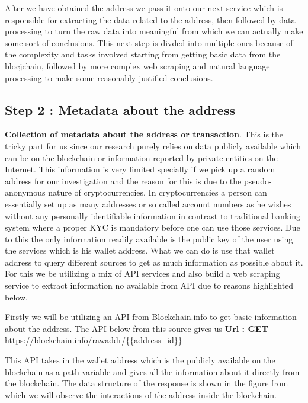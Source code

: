 \documentclass{article}
\begin{document}
        After we have obtained the address we pass it onto our next service which is responsible for extracting the data related to the address, then followed by data processing to turn the raw data into meaningful from which we can actually make some sort of conclusions. This next step is divded into multiple ones because of the complexity and tasks involved starting from getting basic data from the blocjchain, followed by more complex web scraping and natural language processing to make some reasonably justified conclusions.
        
        
    \subsection{Step 2 : Metadata about the address}
    
        \textbf{Collection of metadata about the address or transaction}. 
        This is the tricky part for us since our research purely relies on data publicly available which can be on the blockchain or information reported by private entities on the Internet. This information is very limited specially if we pick up a random address for our investigation and the reason for this is due to the pseudo-anonymous nature of cryptocurrencies. In cryptocurrencies a person can essentially set up as many addresses or so called account numbers as he wishes without any personally identifiable information in contrast to traditional banking system where a proper KYC is mandatory before one can use those services. Due to this the only information readily available is the public key of the user using the services which is his wallet address. What we can do is use that wallet address to query different sources to get as much information as possible about it. For this we be utilizing a mix of API services and also build a web scraping service to extract information no available from API due to reasons highlighted below.
        
        
        
        Firstly we will be utilizing an API from Blockchain.info\cite{blockchain.com} to get basic information about the address. The API below from this source gives us
        \textbf{Url : GET} \url{https://blockchain.info/rawaddr/{{address_id}}}
        
        This API takes in the wallet address which is the publicly available on the blockchain as a path variable and gives all the information about it directly from the blockchain. The data structure of the response is shown in the figure\cite{} from which we will observe the interactions of the address inside the blockchain.
        
\end{document}
